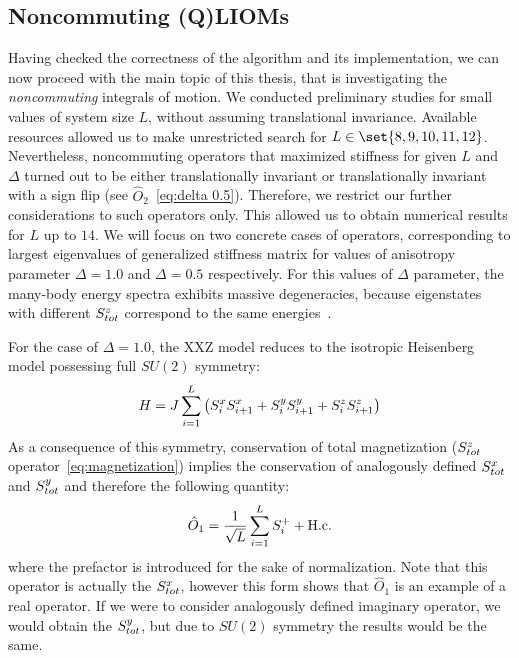 \subsection{Noncommuting (Q)LIOMs}
Having checked the correctness of the algorithm and its implementation, we can now proceed with the
main topic of this thesis, that is investigating the \textit{noncommuting} integrals of motion. 
We conducted preliminary studies for small values of system size \(L\), without assuming
translational invariance. Available resources allowed us to make unrestricted search for
 \(L \in \set{8,9,10,11,12}\). Nevertheless, noncommuting operators that maximized stiffness for given 
 \(L\) and \(\Delta \) turned out to be either translationally invariant or translationally invariant with
 a sign flip (see \(\hat{O}_2\)~\eqref{eq:delta 0.5}). Therefore, we restrict our further 
considerations to such operators only. This allowed us to obtain numerical
results for \(L\) up to \(14\). We will focus on two concrete cases of operators, corresponding
to largest eigenvalues of generalized stiffness matrix for values of anisotropy
parameter \(\Delta=1.0\) and \(\Delta=0.5\) respectively. For this values of
\( \Delta \) parameter, the many-body energy spectra exhibits massive degeneracies, because
eigenstates with different \(S^{z}_{tot}\) correspond to the same energies~\autocite{Fagotti2014,Mierzejewski2021}.

For the case of \(\Delta=1.0\), the XXZ model reduces to the isotropic Heisenberg model possessing full
\(SU(2)\) symmetry:
\begin{equation}
  H = J \sum_{i=1}^L \left(S^{x}_i S^{x}_{i+1} + S^{y}_i S^{y}_{i+1} + S^{z}_i S^{z}_{i+1}\right)
\end{equation}
As a consequence of this symmetry, conservation of total magnetization 
(\(S^{z}_{tot}\) operator~\eqref{eq:magnetization}) implies the conservation of analogously defined \(S^{x}_{tot}\)
and \(S^{y}_{tot}\) and therefore the following quantity:
\begin{equation}
    \hat{O}_{1} =  \frac{1}{\sqrt{L}}\sum_{i=1}^{L} S^{+}_{i} + \text{H.c.}
    \label{eq:delta 1.0}
\end{equation}
where the prefactor is introduced for the sake of normalization. Note that
this operator is actually the \(S^{x}_{tot}\), however this form shows that \(\hat{O}_1\) 
is an example of a real operator. If we were to consider analogously defined imaginary operator,
we would obtain the \(S^{y}_{tot}\), but due to \(SU(2)\) symmetry the results would be the same.


